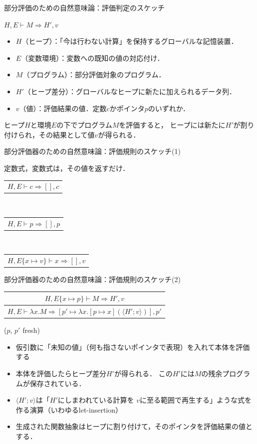 \documentclass[aspectratio=169,t,dvipdfmx,12pt]{beamer}
\newcommand\infer[2]{\begin{tabular}{c}#1\relax\\\hline#2\end{tabular}}
\begin{document}
\begin{frame}{部分評価のための自然意味論：評価判定のスケッチ}

\begin{center}\large
$H, E \vdash M \Rightarrow H', v$
\end{center}
\begin{itemize}
\item $H$（ヒープ）：「今は行わない計算」を保持するグローバルな記憶装置．
\item $E$（変数環境）：変数への既知の値の対応付け．
\item $M$（プログラム）：部分評価対象のプログラム．
\item $H'$（ヒープ差分）：グローバルなヒープに新たに加えられるデータ列．
\item $v$（値）：評価結果の値．定数$c$かポインタ$p$のいずれか．
\end{itemize}

\bigskip

ヒープ$H$と環境$E$の下でプログラム$M$を評価すると，
ヒープには新たに$H'$が割り付けられ，その結果として値$v$が得られる．

\end{frame}

\begin{frame}{部分評価器のための自然意味論：評価規則のスケッチ(1)}

定数式，変数式は，その値を返すだけ．

\begin{tabbing}
\infer{}{$H, E \vdash c \Rightarrow [], c$}
\\[5pt]
\infer{}{$H, E \vdash p \Rightarrow [], p$}
\\[5pt]
\infer{}{$H, E\{x\mapsto v\} \vdash x \Rightarrow [], v$}
\end{tabbing}

\end{frame}

\begin{frame}{部分評価器のための自然意味論：評価規則のスケッチ(2)}

\begin{center}
\infer
{$H, E\{x\mapsto p\} \vdash M \Rightarrow H', v$}
{$H, E \vdash \lambda x. M \Rightarrow [p'\mapsto \lambda x. [p\mapsto x](\langle H'; v \rangle)], p'$}
($p$, $p'$ fresh)
\end{center}

\begin{itemize}
\item 仮引数に「未知の値」（何も指さないポインタで表現）を入れて本体を評価する
\item 本体を評価したらヒープ差分$H'$が得られる．
この$H'$には$M$の残余プログラムが保存されている．
\item $\langle H'; v\rangle$は「$H'$にしまわれている計算を
$v$に至る範囲で再生する」ような式を作る演算（いわゆるlet-insertion）
\item 生成された関数抽象はヒープに割り付けて，そのポインタを評価結果の値とする．
\end{itemize}

\end{frame}
\end{document}
